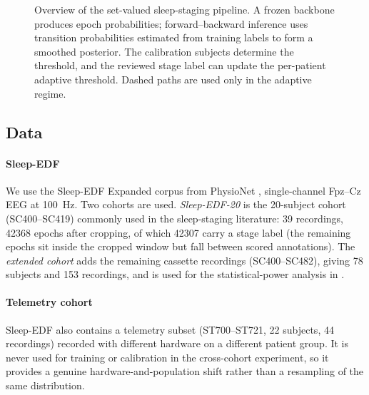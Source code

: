 \begin{figure}[t]
{}%
  \caption{Overview of the set-valued sleep-staging pipeline. A frozen
  backbone produces epoch probabilities; forward--backward inference uses
  transition probabilities estimated from training labels to form a smoothed
  posterior. The calibration subjects determine the threshold, and the
  reviewed stage label can update the per-patient adaptive threshold. Dashed
  paths are used only in the adaptive regime.}
  \label{fig:pipeline}
\end{figure}

\subsection{Data}
\label{sec:data}

\paragraph{Sleep-EDF}
We use the Sleep-EDF Expanded corpus from PhysioNet
\citep{kemp2000,goldberger2000}, single-channel Fpz--Cz EEG at
\SI{100}{\hertz}. Two cohorts are used. \emph{Sleep-EDF-20} is the
20-subject cohort (SC400--SC419) commonly used in the sleep-staging
literature: 39 recordings, \num{42368} epochs after cropping, of which
\num{42307} carry a stage label (the remaining epochs sit inside the cropped
window but fall between scored annotations). The
\emph{extended cohort} adds the remaining cassette recordings (SC400--SC482),
giving 78 subjects and 153 recordings, and is used for the
statistical-power analysis in .

\paragraph{Telemetry cohort}
Sleep-EDF also contains a telemetry subset (ST700--ST721, 22 subjects,
44 recordings) recorded with different hardware on a different patient
group. It is never used for training or calibration in the cross-cohort
experiment, so it provides a genuine hardware-and-population shift rather
than a resampling of the same distribution.

